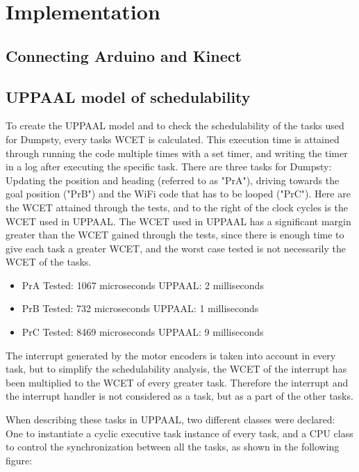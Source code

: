 \section{Implementation}
\label{sec:i3Implementation}

\subsection{Connecting Arduino and Kinect}
\label{sec:i3Connecting Arduino and Kinect implementation}

\subsection{UPPAAL model of schedulability}
\label{sec:i3UPPAAL model}
To create the UPPAAL model and to check the schedulability of the tasks used for Dumpsty, every tasks WCET is calculated. This execution time is attained through running the code multiple times with a set timer, and writing the timer in a log after executing the specific task. There are three tasks for Dumpsty: Updating the position and heading (referred to as "PrA"), driving towards the goal position ("PrB") and the WiFi code that has to be looped ("PrC"). Here are the WCET attained through the tests, and to the right of the clock cycles is the WCET used in UPPAAL. The WCET used in UPPAAL has a significant margin greater than the WCET gained through the tests, since there is enough time to give each task a greater WCET, and the worst case tested is not necessarily the WCET of the tasks. 

\begin{itemize}
	\item PrA \tab Tested: 1067 microseconds \tab UPPAAL: 2 milliseconds
	\item PrB \tab Tested: 732  microseconds \tab UPPAAL: 1 milliseconds
	\item PrC \tab	Tested: 8469 microseconds \tab UPPAAL: 9 milliseconds
\end{itemize}

The interrupt generated by the motor encoders is taken into account in every task, but to simplify the schedulability analysis, the WCET of the interrupt has been multiplied to the WCET of every greater task. Therefore the interrupt and the interrupt handler is not considered as a task, but as a part of the other tasks.

When describing these tasks in UPPAAL, two different classes were declared: One to instantiate a cyclic executive task instance of every task, and a CPU class to control the synchronization between all the tasks, as shown in the following figure:

